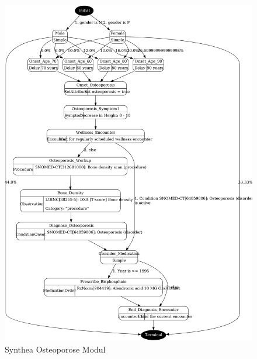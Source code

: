 \documentclass[german,version-2020-11]{uzl-thesis}
\begin{document}
\begin{figure}[htbp]
	\centering
	\includegraphics[width=1.0\textwidth]{assets/osteoporosis.png}
	\caption{Synthea Osteoporose Modul \cite{26}}
	\label{fig:osteoporose}
\end{figure} 
\end{document}

